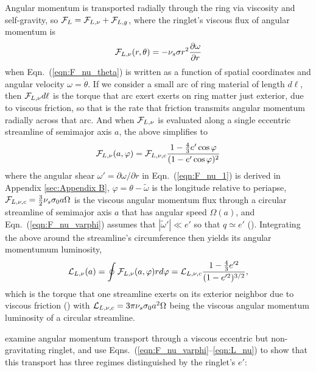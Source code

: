\documentclass[preprint]{aastex62}
\begin{document}
Angular momentum is transported radially through the ring via viscosity and self-gravity, 
so ${\cal F}_L={\cal F}_{L,\nu} + {\cal F}_{L,g}$,
where the ringlet's viscous flux of angular momentum is
\begin{equation}
    \label{eqn:F_nu_1}
    {\cal F}_{L,\nu}(r, \theta) = -\nu_s \sigma r^2\frac{\partial\omega}{\partial r}
\end{equation}
when Eqn.\ (\ref{eqn:F_nu_theta}) is written as a function of spatial coordinates and
angular velocity $\omega=\dot{\theta}$. 
If we consider a small arc of  ring material of length $d\ell$, 
then ${\cal F}_{L,\nu}d\ell$ is the torque that arc exert exerts on
ring matter just exterior, due to viscous friction,
so that is the rate that friction transmits angular momentum radially across that arc.
And when ${\cal F}_{L,\nu}$ is evaluated along a single eccentric streamline of semimajor axis $a$, 
the above simplifies to
\begin{equation}
    \label{eqn:F_nu_varphi}
    {\cal F}_{L,\nu}(a, \varphi) = {\cal F}_{L,\nu,c}\frac{1-\frac{4}{3}e'\cos\varphi}{(1-e'\cos\varphi)^2}
\end{equation}
where the angular shear $\omega'=\partial\omega/\partial r$ in Eqn.\ (\ref{eqn:F_nu_1})
is derived in Appendix \ref{sec:Appendix B},
$\varphi=\theta-\tilde{\omega}$ is the longitude relative to periapse,
${\cal F}_{L,\nu,c}=\frac{3}{2}\nu_s\sigma_0a\Omega$ is the viscous angular momentum flux through a
circular streamline of semimajor axis $a$ that has angular speed $\Omega(a)$,
and Eqn.\ (\ref{eqn:F_nu_varphi}) assumes that $|\tilde{\omega}'|\ll e'$ so that $q\simeq e'$
(\citealt{BGT82}). Integrating the above
around the streamline's circumference then yields its angular momentumum luminosity,
\begin{equation}
    \label{eqn:L_nu}
    {\cal L}_{L,\nu}(a) = \oint {\cal F}_{L,\nu}(a, \varphi)rd\varphi = {\cal L}_{L,\nu,c}\frac{1-\frac{4}{3}e'^2}{(1-e'^2)^{3/2}},
\end{equation}
which is the torque that one streamline exerts on its exterior neighbor due to viscous friction
(\citealt{BGT82}) with ${\cal L}_{L,\nu,c}=3\pi\nu_s\sigma_0a^2\Omega$
being the viscous angular momentum luminosity of a circular streamline.

\citet{BGT82} examine angular momentum transport through a viscous eccentric but non-gravitating ringlet, 
and use Eqns.\ (\ref{eqn:F_nu_varphi}--\ref{eqn:L_nu}) to show that this transport has three 
regimes distinguished by the ringlet's $e'$:
\end{document}

